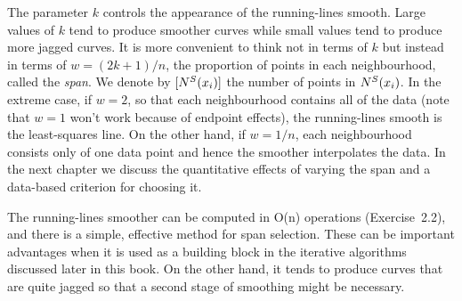%
The parameter  $k$ controls the appearance of the running-lines smooth.
Large values of $k$  tend to produce smoother curves while small values 
 tend to produce more jagged curves.
It is more convenient to  think not in terms of $k$ but instead in terms of
$w=(2k+1)/n$, the proportion of points in each neighbourhood, called the {\it
span}.
We  denote by $[N^S(x_i)]$ the number of points in $N^S(x_i)$.
%
%
 In the extreme case, if $w= 2$, so that each neighbourhood contains all of
the data (note that $w=1$ won't work because of endpoint effects), the running-lines smooth is the least-squares line.
On the other hand, if $w=1/n$, each neighbourhood consists only of one data point
and hence the smoother interpolates the data.
In the next chapter  we  discuss the quantitative effects of varying the span and a
data-based criterion for choosing it.


%
The running-lines smoother can be computed in O(n) operations (Exercise~2.2),
and there is a simple, effective method for span selection.
%
These can be important advantages when it is used as a building block in the
iterative  algorithms discussed  later in this book.
%
On the other hand, it tends to produce curves that are quite jagged so that
%
%
a second stage of smoothing might  be necessary. 




